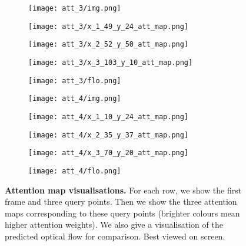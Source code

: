 \documentclass[10pt,twocolumn,letterpaper]{article}
\begin{document}
\begin{figure*}[ht!]
     \begin{subfigure}[b]{0.195\textwidth}
         \centering
         \texttt{[image: att\_3/img.png]}
     \end{subfigure}\hfill
     \begin{subfigure}[b]{0.195\textwidth}
         \centering
         \texttt{[image: att\_3/x\_1\_49\_y\_24\_att\_map.png]}
     \end{subfigure}\hfill
     \begin{subfigure}[b]{0.195\textwidth}
         \centering
         \texttt{[image: att\_3/x\_2\_52\_y\_50\_att\_map.png]}
     \end{subfigure}\hfill
     \begin{subfigure}[b]{0.195\textwidth}
         \centering
         \texttt{[image: att\_3/x\_3\_103\_y\_10\_att\_map.png]}
     \end{subfigure}\hfill
     \begin{subfigure}[b]{0.195\textwidth}
         \centering
         \texttt{[image: att\_3/flo.png]}
     \end{subfigure}

     \begin{subfigure}[b]{0.195\textwidth}
         \centering
         \texttt{[image: att\_4/img.png]}
     \end{subfigure}\hfill
     \begin{subfigure}[b]{0.195\textwidth}
         \centering
         \texttt{[image: att\_4/x\_1\_10\_y\_24\_att\_map.png]}
     \end{subfigure}\hfill
     \begin{subfigure}[b]{0.195\textwidth}
         \centering
         \texttt{[image: att\_4/x\_2\_35\_y\_37\_att\_map.png]}
     \end{subfigure}\hfill
     \begin{subfigure}[b]{0.195\textwidth}
         \centering
         \texttt{[image: att\_4/x\_3\_70\_y\_20\_att\_map.png]}
     \end{subfigure}\hfill
     \begin{subfigure}[b]{0.195\textwidth}
         \centering
         \texttt{[image: att\_4/flo.png]}
     \end{subfigure}\caption{\textbf{Attention map visualisations.} For each row, we show
     the first frame and three query points. Then we show the three attention
     maps corresponding to these query points (brighter colours mean higher attention
     weights). We also give a visualisation of the predicted optical flow for comparison.
     Best viewed on screen.}
     \label{fig:attention_maps}
\end{figure*} 
\end{document}
